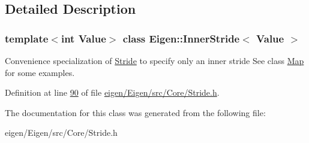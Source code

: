 \subsection{Detailed Description}
\subsubsection*{template$<$int Value$>$\newline
class Eigen\+::\+Inner\+Stride$<$ Value $>$}

Convenience specialization of \hyperlink{group___core___module_class_eigen_1_1_stride}{Stride} to specify only an inner stride See class \hyperlink{group___core___module_class_eigen_1_1_map}{Map} for some examples. 

Definition at line \hyperlink{eigen_2_eigen_2src_2_core_2_stride_8h_source_l00090}{90} of file \hyperlink{eigen_2_eigen_2src_2_core_2_stride_8h_source}{eigen/\+Eigen/src/\+Core/\+Stride.\+h}.



The documentation for this class was generated from the following file\+:\begin{DoxyCompactItemize}
\item 
eigen/\+Eigen/src/\+Core/\+Stride.\+h\end{DoxyCompactItemize}
